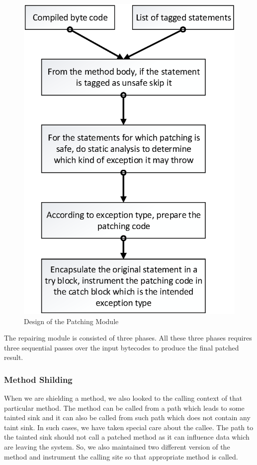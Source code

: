 \begin{figure}
\centering
  \includegraphics[scale= .5]{images/PatchModule.png}
  \caption{Design of the Patching Module}
  \label{fig:PatchModule}
\end{figure}

The repairing module is consisted of three phases. All these three phases
requires three sequential passes over the input bytecodes to produce the final
patched result.


\subsubsection{Method Shilding}
\label{MethodShilding}


When we are shielding a method, we also looked to the calling context of that
particular method. The method can be called from a path which leads to some
tainted sink and it can also be called from such path which does not contain
any taint sink. In such cases, we have taken special care about the callee. The
path to the tainted sink should not call a patched method as it can influence
data which are leaving the system. So, we also maintained two different version of
the method and instrument the calling site so that appropriate method is called.

